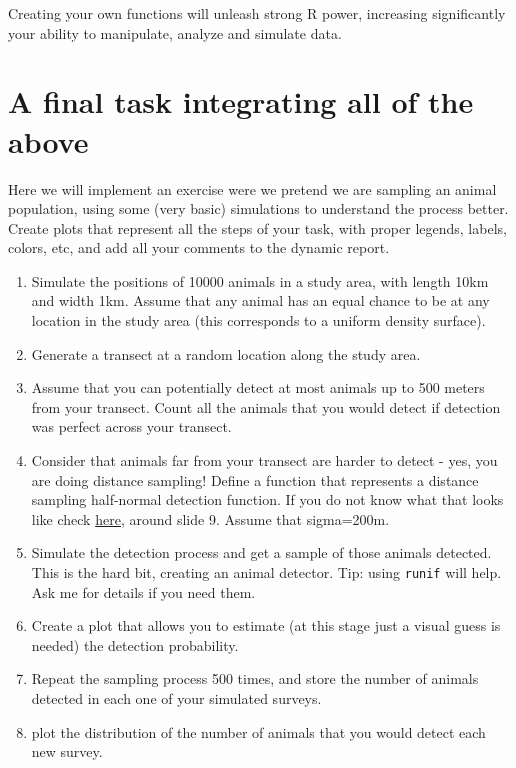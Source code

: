 \documentclass[
]{article}
\begin{document}
Creating your own functions will unleash strong R power, increasing
significantly your ability to manipulate, analyze and simulate data.

\hypertarget{a-final-task-integrating-all-of-the-above}{%
\section{A final task integrating all of the
above}\label{a-final-task-integrating-all-of-the-above}}

Here we will implement an exercise were we pretend we are sampling an
animal population, using some (very basic) simulations to understand the
process better. Create plots that represent all the steps of your task,
with proper legends, labels, colors, etc, and add all your comments to
the dynamic report.

\begin{enumerate}
\def\labelenumi{\arabic{enumi}.}
\item
  Simulate the positions of 10000 animals in a study area, with length
  10km and width 1km. Assume that any animal has an equal chance to be
  at any location in the study area (this corresponds to a uniform
  density surface).
\item
  Generate a transect at a random location along the study area.
\item
  Assume that you can potentially detect at most animals up to 500
  meters from your transect. Count all the animals that you would detect
  if detection was perfect across your transect.
\item
  Consider that animals far from your transect are harder to detect -
  yes, you are doing distance sampling! Define a function that
  represents a distance sampling half-normal detection function. If you
  do not know what that looks like check
  \href{https://workshops.distancesampling.org/online-course/lecturepdfs/Ch1/L1-4\%20Choosing\%20a\%20Detection\%20Function.pdf}{here},
  around slide 9. Assume that sigma=200m.
\item
  Simulate the detection process and get a sample of those animals
  detected. This is the hard bit, creating an animal detector. Tip:
  using \texttt{runif} will help. Ask me for details if you need them.
\item
  Create a plot that allows you to estimate (at this stage just a visual
  guess is needed) the detection probability.
\item
  Repeat the sampling process 500 times, and store the number of animals
  detected in each one of your simulated surveys.
\item
  plot the distribution of the number of animals that you would detect
  each new survey.
\end{enumerate}
\end{document}
